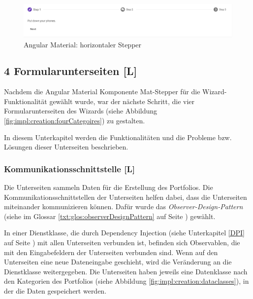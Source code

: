 \begin{figure}
    \centering
    \includegraphics[scale=0.5]{pics/mathorziontalstepper.png}
    \caption{Angular Material: horizontaler Stepper \cite{amStepper}}
    \label{fig:impl:creation:mathorziontalstepper}
\end{figure}

\subsection{4 Formularunterseiten [L]}
Nachdem die Angular Material Komponente Mat-Stepper für die Wizard-Funktionalität gewählt wurde, war der nächste Schritt, die vier Formularunterseiten des Wizards (siehe Abbildung \ref{fig:impl:creation:fourCategoires}) zu gestalten.

In diesem Unterkapitel werden die Funktionalitäten und die Probleme bzw. Lösungen dieser Unterseiten beschrieben. 

\subsubsection{Kommunikationsschnittstelle [L]}
Die Unterseiten sammeln Daten für die Erstellung des Portfolios. Die Kommunikationsschnittstellen der Unterseiten helfen dabei, dass die Unterseiten miteinander kommunizieren können. Dafür wurde das \emph{Observer-Design-Pattern} (siehe im Glossar \ref{txt:glos:observerDesignPattern} auf Seite \pageref{txt:glos:observerDesignPattern}) gewählt.

In einer Dienstklasse, die durch Dependency Injection (siehe Unterkapitel \ref{DPI} auf Seite \pageref{DPI}) mit allen Unterseiten verbunden ist, befinden sich Observablen, die mit den Eingabefeldern der Unterseiten verbunden sind. Wenn auf den Unterseiten eine neue Dateneingabe geschieht, wird die Veränderung an die Dienstklasse weitergegeben. Die Unterseiten haben jeweils eine Datenklasse nach den Kategorien des Portfolios (siehe Abbildung \ref{fig:impl:creation:dataclasses}), in der die Daten gespeichert werden.

